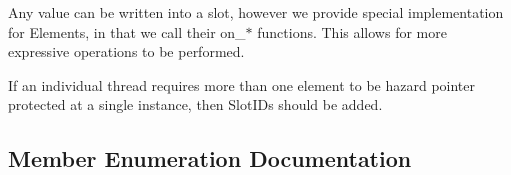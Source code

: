 Any value can be written into a slot, however we provide special implementation for Elements, in that we call their on\+\_\+$\ast$ functions. This allows for more expressive operations to be performed.

If an individual thread requires more than one element to be hazard pointer protected at a single instance, then Slot\+I\+Ds should be added. 

\subsection{Member Enumeration Documentation}
\hypertarget{classtervel_1_1util_1_1memory_1_1hp_1_1_hazard_pointer_a390f6869150121a40b300b955198b897}{}
